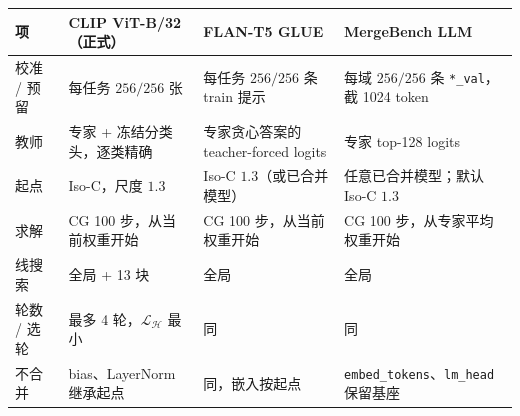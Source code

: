 \begin{tabular}{@{}llll@{}}
\toprule
项 & CLIP ViT-B/32（正式） & FLAN-T5 GLUE & MergeBench LLM \\
\midrule
校准 / 预留 & 每任务 $256/256$ 张 & 每任务 $256/256$ 条 train 提示 & 每域 $256/256$ 条 \texttt{*\_val}，截 1024 token \\
教师 & 专家 + 冻结分类头，逐类精确 & 专家贪心答案的 teacher-forced logits & 专家 top-128 logits \\
起点 & Iso-C，尺度 $1.3$ & Iso-C $1.3$（或已合并模型） & 任意已合并模型；默认 Iso-C $1.3$ \\
求解 & CG 100 步，从当前权重开始 & CG 100 步，从当前权重开始 & CG 100 步，从专家平均权重开始 \\
线搜索 & 全局 + 13 块 & 全局 & 全局 \\
轮数 / 选轮 & 最多 4 轮，$\mathcal L_{\mathcal H}$ 最小 & 同 & 同 \\
不合并 & bias、LayerNorm 继承起点 & 同，嵌入按起点 & \texttt{embed\_tokens}、\texttt{lm\_head} 保留基座 \\
\bottomrule
\end{tabular}
